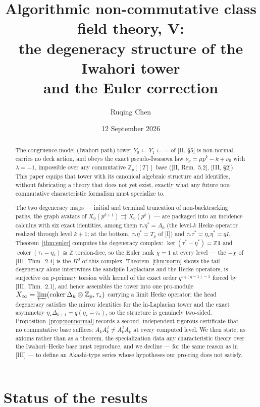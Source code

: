 \documentclass[11pt]{amsart}
\title[Algorithmic non-commutative class field theory, V]
{Algorithmic non-commutative class field theory, V:\\
the degeneracy structure of the Iwahori tower\\ and the Euler correction}
\author{Ruqing Chen}
\date{12 September 2026}
\numberwithin{equation}{section}
\theoremstyle{definition}
\theoremstyle{remark}
\newcommand{\Z}{\mathbb{Z}}
\newcommand{\Zp}{\Z_p}
\newcommand{\coker}{\operatorname{coker}}
\newcommand{\ta}{\tau_*}
\newcommand{\taup}{\tau^*}
\newcommand{\et}{\eta_*}
\newcommand{\etp}{\eta^*}
\begin{document}
\begin{abstract}
The congruence-model (Iwahori path) tower $Y_0\leftarrow Y_1\leftarrow\cdots$ of
[II, \S5] is non-normal, carries no deck action, and obeys the exact pseudo-Iwasawa
law $\nu_p=\mu p^k-k+\nu_0$ with $\lambda=-1$, impossible over any commutative
$\Zp[[T]]$ base ([II, Rem.~5.2], [III, \S2]). This paper equips that tower with its
canonical algebraic structure and identifies, without fabricating a theory that does
not yet exist, exactly what any future non-commutative characteristic formalism must
specialize to.

The two degeneracy maps --- initial and terminal truncation of non-backtracking paths,
the graph avatars of $X_0(p^{k+1})\rightrightarrows X_0(p^k)$ --- are packaged into an
incidence calculus with six exact identities, among them
$\ta\etp=A_k$ (the level-$k$ Hecke operator realized through level $k{+}1$; at the
bottom, $\ta\etp=T_p$ of [I]) and $\ta\taup=\et\etp=qI$. Theorem~\ref{thm:euler}
computes the degeneracy complex: $\ker(\taup-\etp)=\Z\mathbf1$ and
$\coker(\ta-\et)\cong\Z$ torsion-free, so the Euler rank $\chi=1$ at every level ---
the $-\chi$ of [III, Thm.~2.4] is the $H^0$ of this complex. Theorem~\ref{thm:norm}
shows the tail degeneracy alone intertwines the sandpile Laplacians and the Hecke
operators, is surjective on $p$-primary torsion with kernel of the exact order
$q^{\,n_k(q-1)-1}$ forced by [III, Thm.~2.1], and hence assembles the tower into one
pro-module $X_\infty=\varprojlim(\coker\Delta_k\otimes\Zp,\ta)$ carrying a limit Hecke
operator; the head degeneracy satisfies the mirror identities for the in-Laplacian
tower and the exact asymmetry $\et\Delta_{k+1}=q(\et-\ta)$, so the structure is
genuinely two-sided. Proposition~\ref{prop:nonnormal} records a second, independent
rigorous certificate that no commutative base suffices: $A_kA_k^{\,t}\neq
A_k^{\,t}A_k$ at every computed level. We then state, as axioms rather than as a
theorem, the specialization data any characteristic theory over the Iwahori--Hecke
base must reproduce, and we decline --- for the same reason as in [III] --- to define
an Akashi-type series whose hypotheses our pro-ring does not satisfy.
\end{abstract}

\maketitle

\section*{Status of the results}
\end{document}
